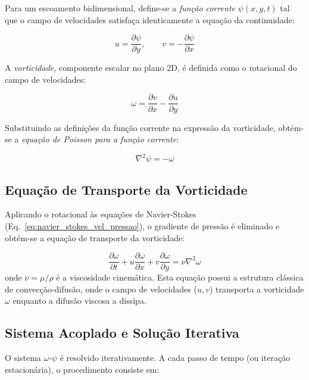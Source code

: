 Para um escoamento bidimensional, define-se a \textit{função corrente} $\psi(x,y,t)$ tal que o campo de velocidades satisfaça identicamente a equação da continuidade:

\begin{equation}
u = \frac{\partial \psi}{\partial y}, \qquad v = -\frac{\partial \psi}{\partial x}
\label{eq:funcao_corrente}
\end{equation}

A \textit{vorticidade}, componente escalar no plano 2D, é definida como o rotacional do campo de velocidades:

\begin{equation}
\omega = \frac{\partial v}{\partial x} - \frac{\partial u}{\partial y}
\label{eq:vorticidade_def}
\end{equation}

Substituindo as definições da função corrente na expressão da vorticidade, obtém-se a \textit{equação de Poisson para a função corrente}:

\begin{equation}
\nabla^2 \psi = -\omega
\label{eq:poisson_psi}
\end{equation}

\subsection{Equação de Transporte da Vorticidade}

Aplicando o rotacional às equações de Navier-Stokes (Eq.~\ref{eq:navier_stokes_vel_pressao}), o gradiente de pressão é eliminado e obtém-se a equação de transporte da vorticidade:

\begin{equation}
\frac{\partial \omega}{\partial t} + u \frac{\partial \omega}{\partial x} + v \frac{\partial \omega}{\partial y} = \nu \nabla^2 \omega
\label{eq:transporte_vorticidade}
\end{equation}
onde $\nu = \mu/\rho$ é a viscosidade cinemática. Esta equação possui a estrutura clássica de convecção-difusão, onde o campo de velocidades ($u, v$) transporta a vorticidade $\omega$ enquanto a difusão viscosa a dissipa.

\subsection{Sistema Acoplado e Solução Iterativa}

O sistema $\omega$-$\psi$ é resolvido iterativamente. A cada passo de tempo (ou iteração estacionária), o procedimento consiste em:

